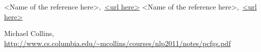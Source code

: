 \cleardoublepage
{}
{}
\begin{thebibliography}{99}

<Name of the reference here>,\ \url{<url here>}
<Name of the reference here>,\ \url{<url here>}

 Michael Collins, \url{http://www.cs.columbia.edu/~mcollins/courses/nlp2011/notes/pcfgs.pdf}




\end{thebibliography}
